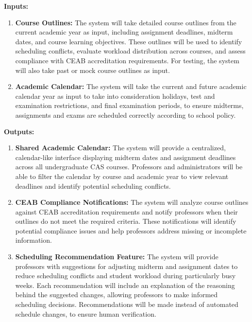 \documentclass{article}
\begin{document}
\textbf{Inputs:} 
\begin{enumerate}
    \item \textbf{Course Outlines:} The system will take detailed course outlines from the current
    academic year as input, including assignment deadlines, midterm dates, and
    course learning objectives. These outlines will be used to identify scheduling
    conflicts, evaluate workload distribution across courses, and assess compliance
    with CEAB accreditation requirements. For testing, the system will also take
    past or mock course outlines as input. 
    \item \textbf{Academic Calendar:} The system will take the current and future academic calendar year as input to 
    take into consideration holidays, test and examination restrictions, and final examination periods, to ensure 
    midterms, assignments and exams are scheduled correctly according to school policy. 
\end{enumerate}

\textbf{Outputs:}
\begin{enumerate}
    \item \textbf{Shared Academic Calendar:} The system will provide a centralized, calendar-like 
    interface displaying midterm dates and assignment deadlines across all undergraduate CAS 
    courses. Professors and administrators will be able to filter the calendar by 
    course and academic year to view relevant deadlines and identify potential scheduling conflicts.

    \item \textbf{CEAB Compliance Notifications:} The system will analyze
    course outlines against CEAB accreditation requirements and notify
    professors when their outlines do not meet the required criteria. These
    notifications will identify potential compliance issues and help professors
    address missing or incomplete information.

    \item \textbf{Scheduling Recommendation Feature:} The system will provide
    professors with suggestions for adjusting midterm and assignment dates to
    reduce scheduling conflicts and student workload during particularly busy
    weeks. Each recommendation will include an explanation of the reasoning
    behind the suggested changes, allowing professors to make informed
    scheduling decisions. Recommendations will be made instead of automated schedule 
    changes, to ensure human verification.
\end{enumerate}
\end{document}
